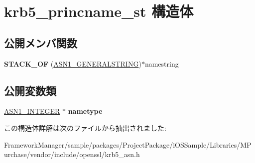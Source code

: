 \hypertarget{structkrb5__princname__st}{}\section{krb5\+\_\+princname\+\_\+st 構造体}
\label{structkrb5__princname__st}
\subsection*{公開メンバ関数}
\begin{DoxyCompactItemize}
\item 
\hypertarget{structkrb5__princname__st_a7fc43d15e006e5fe1fa4ece16361f68a}{}{\bfseries S\+T\+A\+C\+K\+\_\+\+O\+F} (\hyperlink{structasn1__string__st}{A\+S\+N1\+\_\+\+G\+E\+N\+E\+R\+A\+L\+S\+T\+R\+I\+N\+G})$\ast$namestring\label{structkrb5__princname__st_a7fc43d15e006e5fe1fa4ece16361f68a}

\end{DoxyCompactItemize}
\subsection*{公開変数類}
\begin{DoxyCompactItemize}
\item 
\hypertarget{structkrb5__princname__st_a0cc37375579e858fd5956ec1d824a8c2}{}\hyperlink{structasn1__string__st}{A\+S\+N1\+\_\+\+I\+N\+T\+E\+G\+E\+R} $\ast$ {\bfseries nametype}\label{structkrb5__princname__st_a0cc37375579e858fd5956ec1d824a8c2}

\end{DoxyCompactItemize}


この構造体詳解は次のファイルから抽出されました\+:\begin{DoxyCompactItemize}
\item 
Framework\+Manager/sample/packages/\+Project\+Package/i\+O\+S\+Sample/\+Libraries/\+M\+Purchase/vendor/include/openssl/krb5\+\_\+asn.\+h\end{DoxyCompactItemize}
